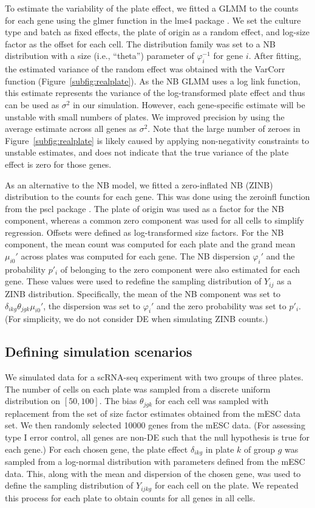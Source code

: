 \documentclass{article}
\begin{document}
To estimate the variability of the plate effect, we fitted a GLMM to the counts for each gene using the glmer function in the lme4 package \citep{bates2015fitting}.
We set the culture type and batch as fixed effects, the plate of origin as a random effect, and log-size factor as the offset for each cell.
The distribution family was set to a NB distribution with a size (i.e., ``theta'') parameter of $\varphi_i^{-1}$ for gene $i$.
After fitting, the estimated variance of the random effect was obtained with the VarCorr function (Figure~\ref{subfig:realplate}).
As the NB GLMM uses a log link function, this estimate represents the variance of the log-transformed plate effect and thus can be used as $\sigma^2$ in our simulation.
However, each gene-specific estimate will be unstable with small numbers of plates.
We improved precision by using the average estimate across all genes as $\sigma^2$.
Note that the large number of zeroes in Figure~\ref{subfig:realplate} is likely caused by applying non-negativity constraints to unstable estimates, and does not indicate that the true variance of the plate effect is zero for those genes. 

As an alternative to the NB model, we fitted a zero-inflated NB (ZINB) distribution to the counts for each gene.
This was done using the zeroinfl function from the pscl package \citep{zeilis2008regression}.
The plate of origin was used as a factor for the NB component, whereas a common zero component was used for all cells to simplify regression.
Offsets were defined as log-transformed size factors.
For the NB component, the mean count was computed for each plate and the grand mean $\mu_{i0}'$ across plates was computed for each gene.
The NB dispersion $\varphi_i'$ and the probability $p'_i$ of belonging to the zero component were also estimated for each gene.
These values were used to redefine the sampling distribution of $Y_{ij}$ as a ZINB distribution.
Specifically, the mean of the NB component was set to $\delta_{ikg}\theta_{jgk}\mu_{i0}'$, the dispersion was set to $\varphi_i'$ and the zero probability was set to $p'_i$.
(For simplicity, we do not consider DE when simulating ZINB counts.)

\subsection{Defining simulation scenarios}
We simulated data for a scRNA-seq experiment with two groups of three plates.
The number of cells on each plate was sampled from a discrete uniform distribution on $[50, 100]$.
The bias $\theta_{jgk}$ for each cell was sampled with replacement from the set of size factor estimates obtained from the mESC data set.
We then randomly selected 10000 genes from the mESC data.
(For assessing type I error control, all genes are non-DE such that the null hypothesis is true for each gene.)
For each chosen gene, the plate effect $\delta_{ikg}$ in plate $k$ of group $g$ was sampled from a log-normal distribution with parameters defined from the mESC data.
This, along with the mean and dispersion of the chosen gene, was used to define the sampling distribution of $Y_{ijkg}$ for each cell on the plate.
We repeated this process for each plate to obtain counts for all genes in all cells.
\end{document}
